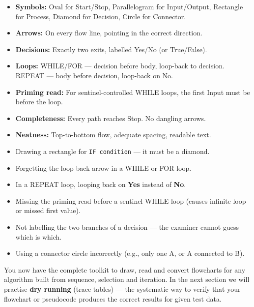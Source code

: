 \documentclass[11pt]{article}
\begin{document}
\begin{aretenir}
\begin{itemize}
    \item \textbf{Symbols:} Oval for Start/Stop, Parallelogram for Input/Output, Rectangle for Process, Diamond for Decision, Circle for Connector.
    \item \textbf{Arrows:} On every flow line, pointing in the correct direction.
    \item \textbf{Decisions:} Exactly two exits, labelled Yes/No (or True/False).
    \item \textbf{Loops:} WHILE/FOR --- decision before body, loop-back to decision. REPEAT --- body before decision, loop-back on No.
    \item \textbf{Priming read:} For sentinel-controlled WHILE loops, the first Input must be before the loop.
    \item \textbf{Completeness:} Every path reaches Stop. No dangling arrows.
    \item \textbf{Neatness:} Top-to-bottom flow, adequate spacing, readable text.
\end{itemize}
\end{aretenir}

\begin{attention}
\begin{itemize}
    \item Drawing a rectangle for \texttt{IF condition} --- it must be a diamond.
    \item Forgetting the loop-back arrow in a WHILE or FOR loop.
    \item In a REPEAT loop, looping back on \textbf{Yes} instead of \textbf{No}.
    \item Missing the priming read before a sentinel WHILE loop (causes infinite loop or missed first value).
    \item Not labelling the two branches of a decision --- the examiner cannot guess which is which.
    \item Using a connector circle incorrectly (e.g., only one A, or A connected to B).
\end{itemize}
\end{attention}

You now have the complete toolkit to draw, read and convert flowcharts for any algorithm built from sequence, selection and iteration. In the next section we will practise \textbf{dry running} (trace tables) --- the systematic way to verify that your flowchart or pseudocode produces the correct results for given test data.
\end{document}
